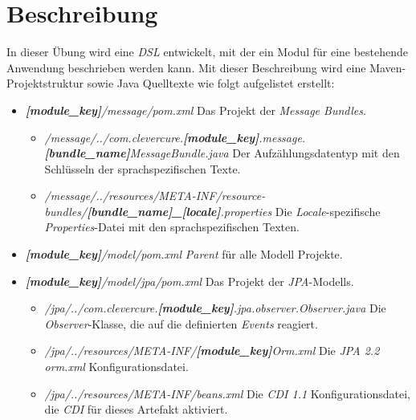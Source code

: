 \section{Beschreibung}
In dieser Übung wird eine \emph{DSL} entwickelt, mit der ein Modul für eine bestehende Anwendung beschrieben werden kann. Mit dieser Beschreibung wird eine Maven-Projektstruktur sowie Java Quelltexte wie folgt aufgelistet erstellt:
\begin{itemize}
	\item\emph{\textbf{[module\_key]}/message/pom.xml}
	\newline
	Das Projekt der \emph{Message Bundles}.

\begin{itemize}
	\item\emph{/message/../com.clevercure.\textbf{[module\_key]}.message.\textbf{[bundle\_name]}MessageBundle.java}
	\newline
	Der Aufzählungsdatentyp mit den Schlüsseln der sprachspezifischen Texte.

	\item\emph{/message/../resources/META-INF/resource-bundles/\textbf{[bundle\_name]\_[locale]}.properties}
	\newline
	Die \emph{Locale}-spezifische \emph{Properties}-Datei mit den sprachspezifischen Texten.	
	\end{itemize}
	
	\item\emph{\textbf{[module\_key]}/model/pom.xml}
	\newline
	\emph{Parent} für alle Modell Projekte.
	
	\item\emph{\textbf{[module\_key]}/model/jpa/pom.xml}
	\newline
	Das Projekt der \emph{JPA}-Modells.
	\begin{itemize}
		\item\emph{/jpa/../com.clevercure.\textbf{[module\_key]}.jpa.observer.Observer.java}
		\newline
		Die \emph{Observer}-Klasse, die auf die definierten \emph{Events} reagiert.	
		\item\emph{/jpa/../resources/META-INF/\textbf{[module\_key]}Orm.xml}
		\newline
		Die \emph{JPA 2.2 orm.xml} Konfigurationsdatei.	
		\item\emph{/jpa/../resources/META-INF/beans.xml}
		\newline
		Die \emph{CDI 1.1} Konfigurationsdatei, die \emph{CDI} für dieses Artefakt aktiviert.	
	\end{itemize}
	

\end{itemize}
